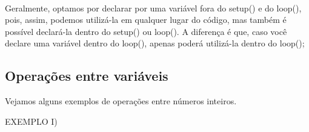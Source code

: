 \documentclass[conference]{IEEEtran}
\begin{document}
    \\
    \par
    Geralmente, optamos por declarar por uma variável fora do { setup()} e do {\selectfont {\color{blue}{void}} loop()}, pois, assim, podemos utilizá-la em qualquer lugar do código, mas também é possível declará-la dentro do { setup()} ou {\selectfont {\color{blue}{void}} loop()}. A diferença é que, caso você declare uma variável dentro do {\selectfont {\color{blue}{void}} loop()}, apenas poderá utilizá-la dentro do {\selectfont {\color{blue}{void}} loop()};
    \begin{center}
        \subsection{Operações entre variáveis}
    \end{center}
    \par
    Vejamos alguns exemplos de operações entre números inteiros.
    \begin{center}
        EXEMPLO I)\\
    \end{center}
    \\
\end{document}
